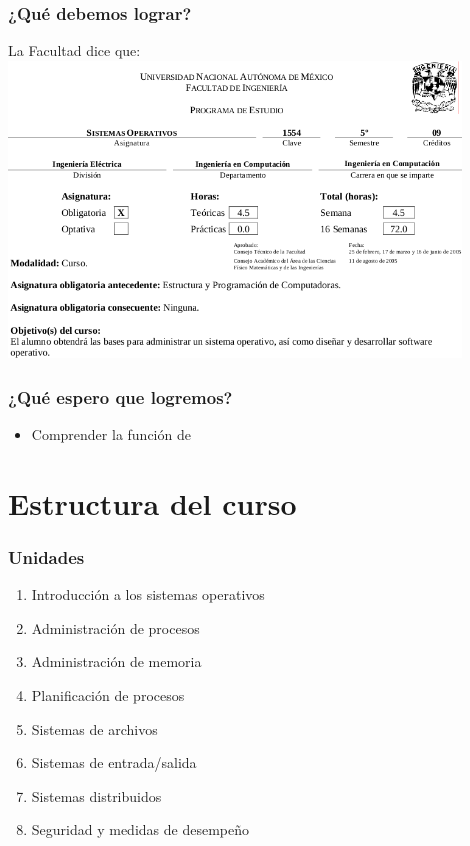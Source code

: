 \documentclass[bigger]{beamer}
\begin{document}
\begin{frame}[fragile]\frametitle{¿Qué debemos lograr?}
\label{sec-3_3}

\begin{center}
La Facultad dice que:\\
\includegraphics[width=0.9\textwidth]{../img/pres/prog_estudio.png}
\end{center}
\end{frame}
\begin{frame}[fragile]\frametitle{¿Qué espero que logremos?}
\label{sec-3_4}

\begin{itemize}
\item Comprender la función de
\end{itemize}
\end{frame}
\section{Estructura del curso}
\label{sec-4}
\begin{frame}[fragile]\frametitle{Unidades}
\label{sec-4_1}

\begin{enumerate}
\item Introducción a los sistemas operativos
\item Administración de procesos
\item Administración de memoria
\item Planificación de procesos
\item Sistemas de archivos
\item Sistemas de entrada/salida
\item Sistemas distribuidos
\item Seguridad y medidas de desempeño
\end{enumerate}
\end{frame}
\end{document}
